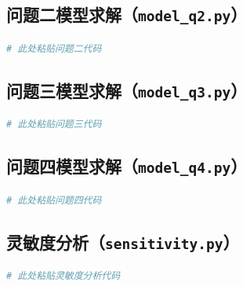 \documentclass[draft,12pt,a4paper]{ctexart}
\theoremstyle{definition}
\begin{document}
\subsection{问题二模型求解（\texttt{model\_q2.py}）}
\begin{lstlisting}[language=Python, caption=问题二核心求解代码示例（节选）]
# 此处粘贴问题二代码
\end{lstlisting}

\subsection{问题三模型求解（\texttt{model\_q3.py}）}
\begin{lstlisting}[language=Python, caption=问题三核心求解代码示例（节选）]
# 此处粘贴问题三代码
\end{lstlisting}

\subsection{问题四模型求解（\texttt{model\_q4.py}）}
\begin{lstlisting}[language=Python, caption=问题四核心求解代码示例（节选）]
# 此处粘贴问题四代码
\end{lstlisting}

\subsection{灵敏度分析（\texttt{sensitivity.py}）}
\begin{lstlisting}[language=Python, caption=灵敏度分析代码示例（节选）]
# 此处粘贴灵敏度分析代码
\end{lstlisting}
\end{document}
